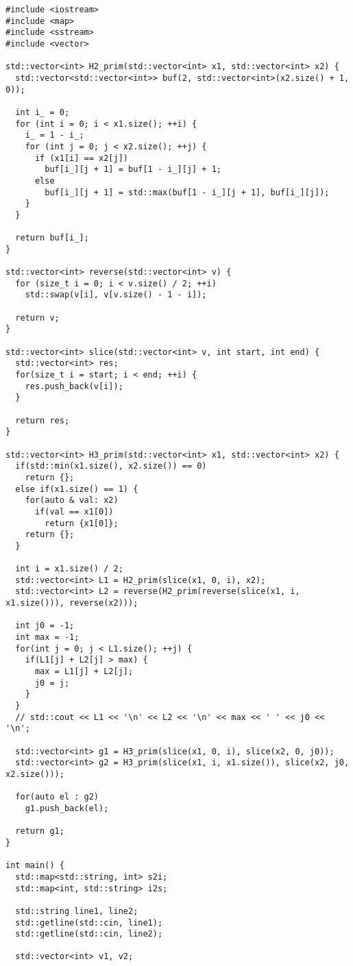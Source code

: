 \begin{verbatim}
#include <iostream>
#include <map>
#include <sstream>
#include <vector>

std::vector<int> H2_prim(std::vector<int> x1, std::vector<int> x2) {
  std::vector<std::vector<int>> buf(2, std::vector<int>(x2.size() + 1, 0));

  int i_ = 0;
  for (int i = 0; i < x1.size(); ++i) {
    i_ = 1 - i_;
    for (int j = 0; j < x2.size(); ++j) {
      if (x1[i] == x2[j])
        buf[i_][j + 1] = buf[1 - i_][j] + 1;
      else
        buf[i_][j + 1] = std::max(buf[1 - i_][j + 1], buf[i_][j]);
    }
  }

  return buf[i_];
}

std::vector<int> reverse(std::vector<int> v) {
  for (size_t i = 0; i < v.size() / 2; ++i)
    std::swap(v[i], v[v.size() - 1 - i]);

  return v;
}

std::vector<int> slice(std::vector<int> v, int start, int end) {
  std::vector<int> res;
  for(size_t i = start; i < end; ++i) {
    res.push_back(v[i]);
  }

  return res;
}

std::vector<int> H3_prim(std::vector<int> x1, std::vector<int> x2) {
  if(std::min(x1.size(), x2.size()) == 0)
    return {};
  else if(x1.size() == 1) {
    for(auto & val: x2)
      if(val == x1[0])
        return {x1[0]};
    return {};
  }

  int i = x1.size() / 2;
  std::vector<int> L1 = H2_prim(slice(x1, 0, i), x2);
  std::vector<int> L2 = reverse(H2_prim(reverse(slice(x1, i, x1.size())), reverse(x2)));

  int j0 = -1;
  int max = -1;
  for(int j = 0; j < L1.size(); ++j) {
    if(L1[j] + L2[j] > max) {
      max = L1[j] + L2[j];
      j0 = j;
    }
  }
  // std::cout << L1 << '\n' << L2 << '\n' << max << ' ' << j0 << '\n';

  std::vector<int> g1 = H3_prim(slice(x1, 0, i), slice(x2, 0, j0));
  std::vector<int> g2 = H3_prim(slice(x1, i, x1.size()), slice(x2, j0, x2.size()));

  for(auto el : g2) 
    g1.push_back(el);

  return g1;
}

int main() {
  std::map<std::string, int> s2i;
  std::map<int, std::string> i2s;

  std::string line1, line2;
  std::getline(std::cin, line1);
  std::getline(std::cin, line2);

  std::vector<int> v1, v2;


\end{verbatim}
